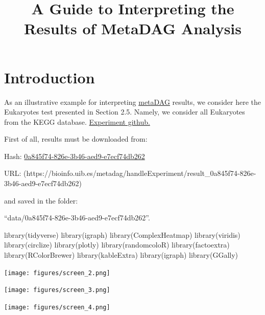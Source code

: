 \documentclass[
  letterpaper,
  DIV=11,
  numbers=noendperiod]{scrreprt}
\title{A Guide to Interpreting the Results of MetaDAG Analysis}
\author{}
\date{}
\newenvironment{Shaded}{}{}
\newcommand{\FunctionTok}[1]{\textcolor[rgb]{0.38,0.69,0.94}{#1}}
\newcommand{\NormalTok}[1]{\textcolor[rgb]{0.67,0.70,0.75}{#1}}
\renewcommand*\contentsname{Table of contents}
\newcommand\contentsname{Table of contents}
\begin{document}
\maketitle

\renewcommand*\contentsname{Table of contents}
{
\hypersetup{linkcolor=blue}
\setcounter{tocdepth}{2}
\tableofcontents
}


\chapter{Introduction}\label{introduction}

As an illustrative example for interpreting
\href{https://bioinfo.uib.es/metadag/}{metaDAG} results, we consider
here the Eukaryotes test presented in Section 2.5. Namely, we consider
all Eukaryotes from the KEGG database.
\href{https://www.github.com/biocom-uib/metadag}{Experiment github.}

First of all, results must be downloaded from:

Hash:
\href{https://bioinfo.uib.es/metadag/handleExperiment/0a845f74-826e-3b46-aed9-e7ecf74db262}{0a845f74-826e-3b46-aed9-e7ecf74db262}

URL:
(https://bioinfo.uib.es/metadag/handleExperiment/result\_0a845f74-826e-3b46-aed9-e7ecf74db262)

and saved in the folder:

``data/0a845f74-826e-3b46-aed9-e7ecf74db262''.

\begin{Shaded}
\begin{Highlighting}[]
\FunctionTok{library}\NormalTok{(tidyverse)}
\FunctionTok{library}\NormalTok{(igraph)}
\FunctionTok{library}\NormalTok{(ComplexHeatmap)}
\FunctionTok{library}\NormalTok{(viridis)}
\FunctionTok{library}\NormalTok{(circlize)}
\FunctionTok{library}\NormalTok{(plotly)}
\FunctionTok{library}\NormalTok{(randomcoloR)}
\FunctionTok{library}\NormalTok{(factoextra)}
\FunctionTok{library}\NormalTok{(RColorBrewer)}
\FunctionTok{library}\NormalTok{(kableExtra)}
\FunctionTok{library}\NormalTok{(igraph)}
\FunctionTok{library}\NormalTok{(GGally)}
\end{Highlighting}
\end{Shaded}

\texttt{[image: figures/screen\_2.png]}

\texttt{[image: figures/screen\_3.png]}

\texttt{[image: figures/screen\_4.png]}
\end{document}
